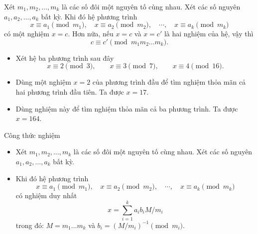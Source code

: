 \begin{frame}
	\begin{thrm}
		Xét $m_1, m_2, \dots, m_k$ là các số đôi một nguyên tố cùng nhau. Xét các số nguyên $a_1, a_2, \dots, a_k$ bất kỳ. Khi đó hệ phương trình
		\[
		x \equiv a_1\pmod{m_1},\quad x \equiv a_2\pmod{m_2},\quad \cdots,\quad x \equiv a_k\pmod{m_k} 
		\]
		có một nghiệm $x = c$. Hơn nữa, nếu $x=c$ và $x=c'$ là hai nghiệm của hệ, vậy thì 
		$$
			c \equiv c'  \pmod{m_1 m_2 \dots m_k}.
		$$
	\end{thrm}
\end{frame}

\begin{frame}
	\begin{xmpl}
\begin{itemize}
	\item<+-> Xét hệ ba phương trình sau đây 
		\[
			x \equiv 2 \pmod{3},\qquad x\equiv 3 \pmod{7},\qquad x \equiv 4 \pmod{16}. 
		\]
		
		\item<+-> Dùng một nghiệm $x=2$ của phương trình đầu để tìm nghiệm thỏa mãn cả hai phương trình đầu tiên. Ta được $x = 17$.
 
 \item<+-> Dùng nghiệm này để tìm nghiệm thỏa mãn cả ba phương trình. Ta được $x=164$. 
\end{itemize}			
\end{xmpl}
\end{frame}

\begin{frame}{Công thức nghiệm}
	\begin{itemize}
		\item 		Xét $m_1, m_2, \dots, m_k$ là các số đôi một nguyên tố cùng nhau. Xét các số nguyên $a_1, a_2, \dots, a_k$ bất kỳ. 
		\item<+-> Khi đó hệ phương trình
		\[
		x \equiv a_1\pmod{m_1},\quad x \equiv a_2\pmod{m_2},\quad \cdots,\quad x \equiv a_k\pmod{m_k} 
		\]
		có nghiệm duy nhất
		\[
			x = \sum_{i=1}^k a_i b_i M/m_i
		\]
		trong đó: $M = m_1\dots m_k$ và $b_i = \left(M/m_i\right)^{-1} \pmod{m_i}$.
	\end{itemize}
\end{frame}

